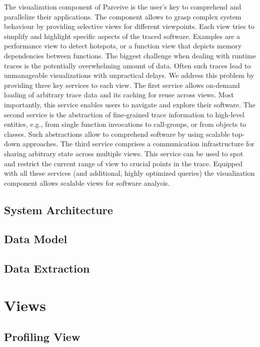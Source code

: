 \documentclass[conference]{IEEEtran}
\begin{document}
The visualization component of Parceive is the user's key to comprehend and parallelize
their applications. The component allows to grasp complex system behaviour by providing
selective views for different viewpoints. Each view tries to simplify and
highlight specific aspects of the traced software. Examples are a performance view to
detect hotspots, or a function view that depicts memory dependencies between functions.
The biggest challenge when dealing with runtime traces is the potentially overwhelming
amount of data. Often such traces lead to unmanageable visualizations with unpractical
delays. We address this problem by providing three key services to each view. The first
service allows on-demand loading of arbitrary trace data and its caching for reuse
across views. Most importantly, this service enables users to navigate and explore
their software. The second service is the abstraction of fine-grained trace information
to high-level entities, e.g., from single function invocations to call-groups, or from
objects to classes. Such abstractions allow to comprehend software by using scalable
top-down approaches. The third service comprises a communication infrastructure for
sharing arbitrary state across multiple views. This service can be used to spot and
restrict the current range of view to crucial points in the trace.  Equipped with all
these services (and additional, highly optimized queries) the visualization component
allows scalable views for software analysis.

\subsection{System Architecture}
\label{sec:system_architecture}

\subsection{Data Model}
\label{sec:data_model}

\subsection{Data Extraction}
\label{sec:data_extraction}

\section{Views}
\label{sec:views}

\subsection{Profiling View}
\label{sec:profiling_view}
\end{document}
